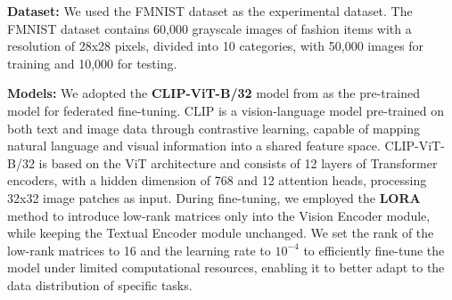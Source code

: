 \documentclass[lettersize,journal]{IEEEtran}
\begin{document}
\textbf{Dataset:} We used the FMNIST\cite{minist} dataset as the experimental dataset. The FMNIST dataset contains 60,000 grayscale images of fashion items with a resolution of 28x28 pixels, divided into 10 categories, with 50,000 images for training and 10,000 for testing.





\textbf{Models:} 
We adopted the \textbf{CLIP-ViT-B/32}\cite{huggingface_clip} model from \cite{clip} as the pre-trained model for federated fine-tuning. CLIP is a vision-language model pre-trained on both text and image data through contrastive learning, capable of mapping natural language and visual information into a shared feature space. CLIP-ViT-B/32 is based on the ViT\cite{vit} architecture and consists of 12 layers of Transformer encoders, with a hidden dimension of 768 and 12 attention heads, processing 32x32 image patches as input. During fine-tuning, we employed the \textbf{LORA}\cite{lora} method to introduce low-rank matrices only into the Vision Encoder module, while keeping the Textual Encoder module unchanged. We set the rank of the low-rank matrices to 16 and the learning rate to \textbf{$10^{-4}$} to efficiently fine-tune the model under limited computational resources, enabling it to better adapt to the data distribution of specific tasks.
\end{document}
